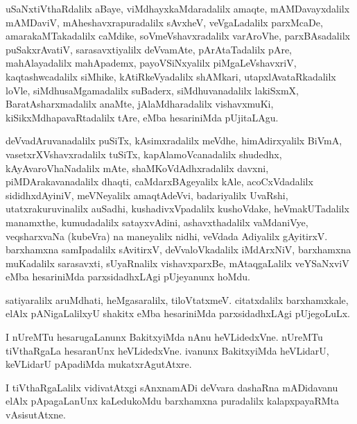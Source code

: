 \documentclass{article}
\begin{document}
\begin{mn}
uSaNxtiVthaRdalilx  aBaye,  viMdhayxkaMdaradalilx  amaqte,  mAMDavayxdalilx  mAMDaviV,  
mAheshavxrapuradalilx  sAvxheV, veVgaLadalilx parxMcaDe,  amarakaMTakadalilx  caMdike,  
soVmeVshavxradalilx  varAroVhe,  parxBAsadalilx puSakxrAvatiV,  sarasavxtiyalilx  
deVvamAte, pArAtaTadalilx  pAre,  mahAlayadalilx  mahApademx,  payoVSiNxyalilx  piMgaLeVshavxriV,  
kaqtashwcadalilx  siMhike, kAtiRkeVyadalilx  shAMkari,  utapxlAvataRkadalilx  loVle,  
siMdhusaMgamadalilx  suBaderx, siMdhuvanadalilx  lakiSxmX,  BaratAsharxmadalilx  anaMte,  
jAlaMdharadalilx  vishavxmuKi,  kiSikxMdhapavaRtadalilx  tAre, eMba hesariniMda  pUjitaLAgu.
\end{mn}

\begin{mn}
deVvadAruvanadalilx puSiTx, kAsimxradalilx meVdhe, himAdirxyalilx BiVmA, vasetxrXVshavxradalilx 
tuSiTx, kapAlamoVcanadalilx  shudedhx,  kAyAvaroVhaNadalilx  mAte,  shaMKoVdAdhxradalilx  davxni,  
piMDArakavanadalilx  dhaqti, caMdarxBAgeyalilx kAle, acoCxVdadalilx  sididhxdAyiniV,  meVNeyalilx  
amaqtAdeVvi,  badariyalilx  UvaRshi,  utatxrakuruvinalilx  auSadhi,  kushadivxVpadalilx kushoVdake,  
heVmakUTadalilx  manamxthe, kumudadalilx  satayxvAdini,  ashavxthadalilx vaMdaniVye,  veqsharxvaNa 
(kubeVra) na maneyalilx  nidhi,  veVdada  Adiyalilx gAyitirxV.  barxhamxna  samIpadalilx  sAvitirxV, 
deVvaloVkadalilx  iMdArxNiV,  barxhamxna muKadalilx  sarasavxti,  sUyaRnalilx  vishavxparxBe, 
mAtaqgaLalilx  veYSaNxviV eMba  hesariniMda  parxsidadhxLAgi  pUjeyanunx  hoMdu.
\end{mn}

\begin{mn}
satiyaralilx  aruMdhati,  heMgasaralilx,  tiloVtatxmeV.  citatxdalilx barxhamxkale,  
elAlx  pANigaLalilxyU  shakitx  eMba hesariniMda  parxsidadhxLAgi pUjegoLuLx.
\end{mn}

\begin{mn}
I nUreMTu  hesarugaLanunx  BakitxyiMda  nAnu  heVLidedxVne.  nUreMTu  tiVthaRgaLa  hesaranUnx  
heVLidedxVne.  ivanunx  BakitxyiMda heVLidarU, keVLidarU pApadiMda mukatxrAgutAtxre.
\end{mn}

\begin{mn}
I tiVthaRgaLalilx  vidivatAtxgi  sAnxnamADi  deVvara  dashaRna  mADidavanu  elAlx  
pApagaLanUnx  kaLedukoMdu  barxhamxna puradalilx kalapxpayaRMta vAsisutAtxne.
\end{mn}
\end{document}
